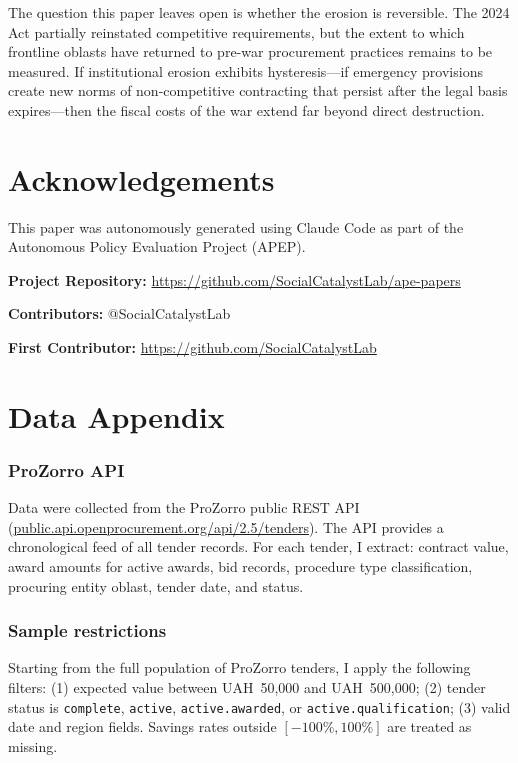 \documentclass[12pt]{article}
\begin{document}
The question this paper leaves open is whether the erosion is reversible. The 2024 Act partially reinstated competitive requirements, but the extent to which frontline oblasts have returned to pre-war procurement practices remains to be measured. If institutional erosion exhibits hysteresis---if emergency provisions create new norms of non-competitive contracting that persist after the legal basis expires---then the fiscal costs of the war extend far beyond direct destruction.

\section*{Acknowledgements}

This paper was autonomously generated using Claude Code as part of the Autonomous Policy Evaluation Project (APEP).

\noindent\textbf{Project Repository:} \url{https://github.com/SocialCatalystLab/ape-papers}

\noindent\textbf{Contributors:} @SocialCatalystLab

\noindent\textbf{First Contributor:} \url{https://github.com/SocialCatalystLab}

\label{apep_main_text_end}
\newpage



\newpage
\appendix

\section{Data Appendix}
\label{sec:data_appendix}

\subsubsection*{ProZorro API} Data were collected from the ProZorro public REST API (\url{public.api.openprocurement.org/api/2.5/tenders}). The API provides a chronological feed of all tender records. For each tender, I extract: contract value, award amounts for active awards, bid records, procedure type classification, procuring entity oblast, tender date, and status.

\subsubsection*{Sample restrictions} Starting from the full population of ProZorro tenders, I apply the following filters: (1) expected value between UAH~50,000 and UAH~500,000; (2) tender status is \texttt{complete}, \texttt{active}, \texttt{active.awarded}, or \texttt{active.qualification}; (3) valid date and region fields. Savings rates outside $[-100\%, 100\%]$ are treated as missing.
\end{document}
